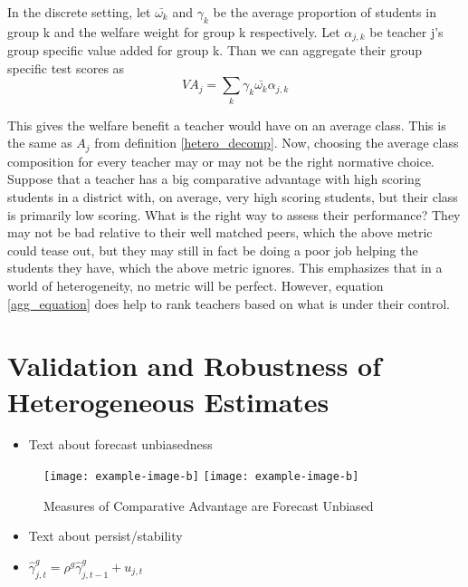 \documentclass[12pt]{article}
\theoremstyle{definition}
\theoremstyle{definition}
\theoremstyle{definition}
\theoremstyle{definition}
\begin{document}
        
        In the discrete setting, let $\bar{\omega_k}$ and $\gamma_k$ be the average proportion of students in group k and the welfare weight for group k respectively. Let $\alpha_{j,k}$ be teacher j's group specific value added for group k. Than we can aggregate their group specific test scores as 
        \begin{equation}
        \label{agg_equation}
            VA_j = \sum_k \gamma_k \bar{\omega_k} \alpha_{j,k}
        \end{equation}
        
        This gives the welfare benefit a teacher would have on an average class. This is the same as $A_j$ from definition \ref{hetero_decomp}. Now, choosing the average class composition for every teacher may or may not be the right normative choice. Suppose that a teacher has a big comparative advantage with high scoring students in a district with, on average, very high scoring students, but their class is primarily low scoring. What is the right way to assess their performance? They may not be bad relative to their well matched peers, which the above metric could tease out, but they may still in fact be doing a poor job helping the students they have, which the above metric ignores. This emphasizes that in a world of heterogeneity, no metric will be perfect. However, equation \ref{agg_equation} does help to rank teachers based on what is under their control. 
        


\section{Validation and Robustness of Heterogeneous Estimates} \label{robustness}


\begin{itemize}
    \item Text about forecast unbiasedness
\end{itemize}


\begin{figure}
    \centering
    \texttt{[image: example-image-b]} \hspace{2em}
    \texttt{[image: example-image-b]}
    \caption{Measures of Comparative Advantage are Forecast Unbiased}


    \label{fig:robust1}
\end{figure}


\begin{itemize}
    \item Text about persist/stability
    \item $\hat{\gamma}^g_{j,t} = \rho^g \hat{\gamma}^g_{j,t-1} + u_{j,t}$
\end{itemize}
\end{document}
